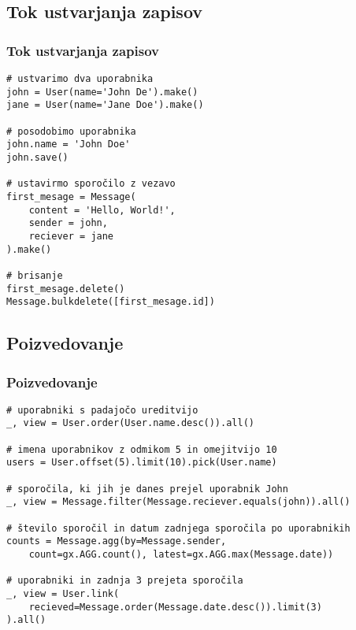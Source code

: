 \documentclass{beamer}
\begin{document}
    \subsection{Tok ustvarjanja zapisov}
    \begin{frame}[fragile]
    \frametitle{Tok ustvarjanja zapisov}
    \footnotesize
    \begin{verbatim}
# ustvarimo dva uporabnika
john = User(name='John De').make()
jane = User(name='Jane Doe').make()

# posodobimo uporabnika
john.name = 'John Doe'
john.save()

# ustavirmo sporočilo z vezavo
first_mesage = Message(
    content = 'Hello, World!',
    sender = john,
    reciever = jane
).make()

# brisanje
first_mesage.delete()
Message.bulkdelete([first_mesage.id])
        \end{verbatim}   
    \end{frame}

    \subsection{Poizvedovanje}
    \begin{frame}[fragile]
    \frametitle{Poizvedovanje}
    \footnotesize
    \begin{verbatim}
# uporabniki s padajočo ureditvijo
_, view = User.order(User.name.desc()).all()

# imena uporabnikov z odmikom 5 in omejitvijo 10
users = User.offset(5).limit(10).pick(User.name)

# sporočila, ki jih je danes prejel uporabnik John
_, view = Message.filter(Message.reciever.equals(john)).all()

# število sporočil in datum zadnjega sporočila po uporabnikih
counts = Message.agg(by=Message.sender, 
    count=gx.AGG.count(), latest=gx.AGG.max(Message.date))

# uporabniki in zadnja 3 prejeta sporočila
_, view = User.link(
    recieved=Message.order(Message.date.desc()).limit(3)
).all()
    
    \end{verbatim}
    \end{frame}
    
\end{document}
